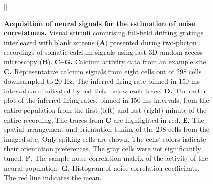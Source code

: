 \documentclass[10pt]{article}
\begin{document}
\begin{figure}    [\FBwidth]
    {\caption{{\bf Acquisition of neural signals for the estimation of noise correlations.}
    Visual stimuli comprising full-field drifting gratings interleaved with blank screens ({\bf A}) presented during two-photon recordings of somatic calcium signals using fast 3D random-access microscopy ({\bf B}). 
    {\bf C--G.} Calcium activity data from an example site.
    {\bf C.} Representative calcium signals from eight cells out of 298 cells downsampled to 20 Hz. The inferred firing rate binned in 150 ms intervals are indicated by red ticks below each trace.
    {\bf D.} The raster plot of the inferred firing rates, binned in 150 ms intervals, from the entire population from the first (left) and last (right) minute of the entire recording.  The traces from {\bf C} are highlighted in red.
    {\bf E.} The spatial arrangement and orientation tuning of the 298 cells from the imaged site. Only spiking cells are shown. The cells' colors indicate their orientation preferences. The gray cells were not significantly tuned.
    {\bf F.} The sample noise correlation matrix of the activity of the neural population. 
    {\bf G.} Histogram of noise correlation coefficients. The red line indicates the mean.
} \label{fig:2}}

\end{figure}
\end{document}
